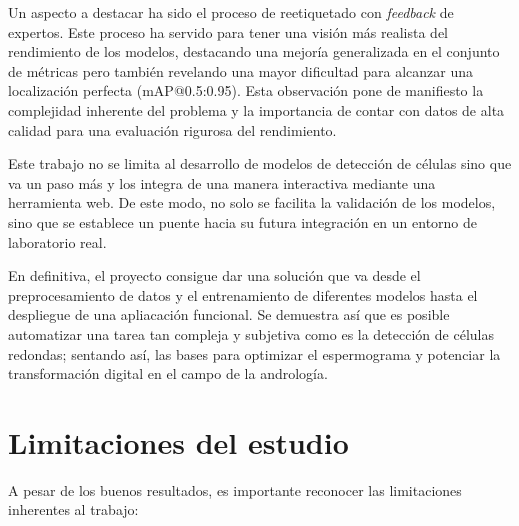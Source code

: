 \documentclass[12pt,a4paper,onecolumn,oneside]{report}
\begin{document}
Un aspecto a destacar ha sido el proceso de reetiquetado con \textit{feedback} de expertos. Este proceso ha servido para tener una visión más realista del rendimiento de los modelos, destacando una mejoría 
generalizada en el conjunto de métricas pero también revelando una mayor dificultad para alcanzar una localización perfecta (mAP@0.5:0.95). Esta observación pone de manifiesto la complejidad inherente 
del problema y la importancia de contar con datos de alta calidad para una evaluación rigurosa del rendimiento.

Este trabajo no se limita al desarrollo de modelos de detección de células sino que va un paso más y los integra de una manera interactiva mediante una herramienta web. 
De este modo, no solo se facilita la validación de los modelos, sino que se establece un puente hacia su futura integración en un entorno de laboratorio real.

En definitiva, el proyecto consigue dar una solución que va desde el preprocesamiento de datos y el entrenamiento de diferentes modelos hasta el despliegue de una apliacación funcional. Se demuestra así que es posible automatizar 
una tarea tan compleja y subjetiva como es la detección de células redondas; sentando así, las bases para optimizar el espermograma y potenciar la transformación digital en el campo de la andrología.

\section{Limitaciones del estudio}
\label{sec:Limitaciones del estudio}

A pesar de los buenos resultados, es importante reconocer las limitaciones inherentes al trabajo:
\end{document}
